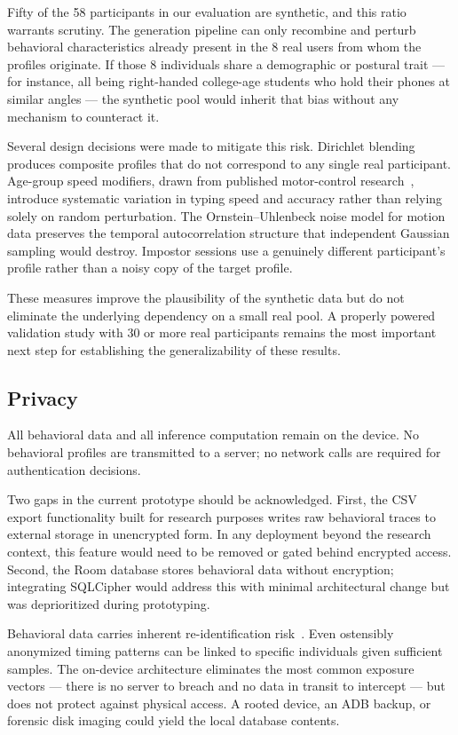 \documentclass[conference]{IEEEtran}
\begin{document}
Fifty of the 58 participants in our evaluation are synthetic, and this ratio warrants scrutiny. The generation pipeline can only recombine and perturb behavioral characteristics already present in the 8 real users from whom the profiles originate. If those 8 individuals share a demographic or postural trait --- for instance, all being right-handed college-age students who hold their phones at similar angles --- the synthetic pool would inherit that bias without any mechanism to counteract it.

Several design decisions were made to mitigate this risk. Dirichlet blending produces composite profiles that do not correspond to any single real participant. Age-group speed modifiers, drawn from published motor-control research~\cite{ketcham2002aging}, introduce systematic variation in typing speed and accuracy rather than relying solely on random perturbation. The Ornstein--Uhlenbeck noise model for motion data preserves the temporal autocorrelation structure that independent Gaussian sampling would destroy. Impostor sessions use a genuinely different participant's profile rather than a noisy copy of the target profile.

These measures improve the plausibility of the synthetic data but do not eliminate the underlying dependency on a small real pool. A properly powered validation study with 30 or more real participants remains the most important next step for establishing the generalizability of these results.

\subsection{Privacy}

All behavioral data and all inference computation remain on the device. No behavioral profiles are transmitted to a server; no network calls are required for authentication decisions.

Two gaps in the current prototype should be acknowledged. First, the CSV export functionality built for research purposes writes raw behavioral traces to external storage in unencrypted form. In any deployment beyond the research context, this feature would need to be removed or gated behind encrypted access. Second, the Room database stores behavioral data without encryption; integrating SQLCipher would address this with minimal architectural change but was deprioritized during prototyping.

Behavioral data carries inherent re-identification risk~\cite{de2013unique}. Even ostensibly anonymized timing patterns can be linked to specific individuals given sufficient samples. The on-device architecture eliminates the most common exposure vectors --- there is no server to breach and no data in transit to intercept --- but does not protect against physical access. A rooted device, an ADB backup, or forensic disk imaging could yield the local database contents.
\end{document}
